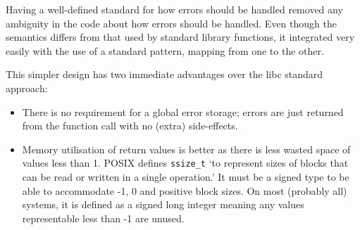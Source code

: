         Having a well-defined standard for how errors should be handled removed any ambiguity in the code about how errors should be handled. Even though the semantics differs from that used by standard library functions, it integrated very easily with the use of a standard pattern, mapping from one to the other.

        This simpler design has two immediate advantages over the libc standard approach:
        \begin{itemize}[noitemsep]
            \item{There is no requirement for a global error storage; errors are just returned from the function call with no (extra) side-effects.}
            \item{Memory utilisation of return values is better as there is less wasted space of values less than 1. POSIX defines \texttt{ssize\_t} `to represent sizes of blocks that can be read or written in a single operation.' It must be a signed type to be able to accommodate -1, 0 and positive block sizes. On most (probably all) systems, it is defined as a signed long integer meaning any values representable less than -1 are unused.}
        \end{itemize}

